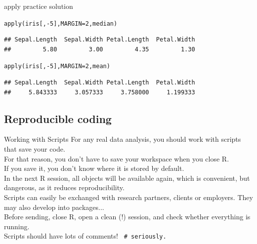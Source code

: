 \documentclass[xcolor=table,       handout,    xcolor=dvipsnames]{beamer}\usepackage[]{graphicx}\usepackage[]{color}
\makeatletter
\newcommand{\hlnum}[1]{\textcolor[rgb]{0,0,0}{#1}}
\newcommand{\hlopt}[1]{\textcolor[rgb]{0,0,0}{#1}}
\newcommand{\hlstd}[1]{\textcolor[rgb]{0,0,0}{#1}}
\newcommand{\hlkwc}[1]{\textcolor[rgb]{1,0,1}{#1}}
\newcommand{\hlkwd}[1]{\textcolor[rgb]{0,0,1}{#1}}
\newenvironment{kframe}{%
 \def\at@end@of@kframe{}%
 \ifinner\ifhmode%
  \def\at@end@of@kframe{\end{minipage}}%
  \begin{minipage}{\columnwidth}%
 \fi\fi%
 \def\FrameCommand##1{\hskip\@totalleftmargin \hskip-\fboxsep
 \colorbox{shadecolor}{##1}\hskip-\fboxsep
     \hskip-\linewidth \hskip-\@totalleftmargin \hskip\columnwidth}%
 \MakeFramed {\advance\hsize-\width
   \@totalleftmargin\z@ \linewidth\hsize
   \@setminipage}}%
 {\par\unskip\endMakeFramed%
 \at@end@of@kframe}
\newenvironment{knitrout}{}{} %
\makeatother
\begin{document}

\begin{frame}[fragile]{apply practice solution}
\begin{knitrout}
\color{fgcolor}\begin{kframe}
\begin{alltt}
\hlkwd{apply}\hlstd{(iris[ ,}\hlopt{-}\hlnum{5}\hlstd{],} \hlkwc{MARGIN}\hlstd{=}\hlnum{2}\hlstd{, median)}
\end{alltt}
\begin{verbatim}
## Sepal.Length  Sepal.Width Petal.Length  Petal.Width 
##         5.80         3.00         4.35         1.30
\end{verbatim}
\end{kframe}
\end{knitrout}
\pause
\begin{knitrout}
\color{fgcolor}\begin{kframe}
\begin{alltt}
\hlkwd{apply}\hlstd{(iris[ ,}\hlopt{-}\hlnum{5}\hlstd{],} \hlkwc{MARGIN}\hlstd{=}\hlnum{2}\hlstd{, mean)}
\end{alltt}
\begin{verbatim}
## Sepal.Length  Sepal.Width Petal.Length  Petal.Width 
##     5.843333     3.057333     3.758000     1.199333
\end{verbatim}
\end{kframe}
\end{knitrout}
\end{frame}

\subsection{Reproducible coding}

\begin{frame}{Working with Scripts}
For any real data analysis, you should work with scripts that save your code.\\
\pause
For that reason, you don't have to save your workspace when you close R.\\
\pause
If you save it, you don't know where it is stored by default. \\ In the next R session, all objects will be available again, which is convenient, but dangerous, as it reduces reproducibility.\\
\pause
Scripts can easily be exchanged with research partners, clients or employers. They may also develop into packages...\\
\pause
Before sending, close R, open a clean (!) session, and check whether everything is running.\\
\pause
Scripts should have lots of comments! \pause \texttt{\textcolor[rgb]{0,0.392,0}{ \# seriously.}}

\end{frame}
\end{document}

